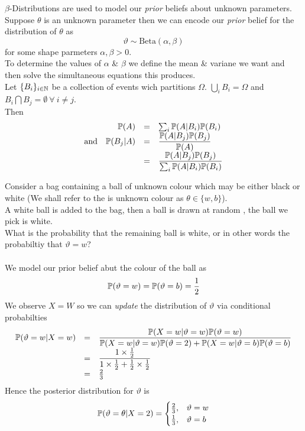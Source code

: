 \documentclass[11pt,a4paper]{article}
\begin{document}
$\beta$-Distributions are used to model our \textit{prior} beliefs about unknown parameters.\\
Suppose $\theta$ is an unknown parameter then we can encode our \textit{prior} belief for the distribution of $\theta$ as
$$\vartheta\sim\text{Beta}(\alpha,\beta)$$
for some shape parmeters $\alpha,\beta>0$.\\
\nb To determine the values of $\alpha$ \& $\beta$ we define the mean \& variane we want and then solve the simultaneous equations this produces.\\

Let $\{B_i\}_{i\in\mathbb{N}}$ be a collection of events wich partitions $\Omega$. \ie $\bigcup_iB_i=\Omega$ and $B_i\bigcap B_j=\emptyset\ \forall\ i\neq j$.\\
Then
\[\begin{array}{rrcl}
&\mathbb{P}(A)&=&\sum_i\mathbb{P}(A|B_i)\mathbb{P}(B_i)\\
\text{and}&\mathbb{P}(B_j|A)&=&\dfrac{\mathbb{P}(A|B_j)\mathbb{P}(B_j)}{\mathbb{P}(A)}\\
&&=&\dfrac{\mathbb{P}(A|B_j)\mathbb{P}(B_j)}{\sum_i\mathbb{P}(A|B_i)\mathbb{P}(B_i)}
\end{array}\]

Consider a bag containing a ball of unknown colour which may be either black or white (We shall refer to the is unknown colour as $\theta\in\{w,b\}$).\\
A white ball is added to the bag, then a ball is drawn at random , the ball we pick is white.\\
What is the probability that the remaining ball is white, or in other words the probabiltiy that $\vartheta=w$?\\
\\
We model our prior belief abut the colour of the ball as
$$\mathbb{P}(\vartheta=w)=\mathbb{P}(\vartheta=b)=\frac{1}{2}$$
We observe $X=W$ so we can \textit{update} the distribution of $\vartheta$ via conditional probabilties
\[\begin{array}{rcl}
\mathbb{P}(\vartheta=w|X=w)&=&\dfrac{\mathbb{P}(X=w|\vartheta=w)\mathbb{P}(\vartheta=w)}{\mathbb{P}(X=w|\vartheta=w)\mathbb{P}(\vartheta=2)+\mathbb{P}(X=w|\vartheta=b)\mathbb{P}(\vartheta=b)}\\
&=&\dfrac{1\times\frac{1}{2}}{1\times\frac{1}{2}+\frac{1}{2}\times\frac{1}{2}}\\
&=&\frac{2}{3}
\end{array}\]
Hence the posterior distribution for $\vartheta$ is
$$\mathbb{P}(\vartheta=\theta|X=2)=\begin{cases}\frac{2}{3},&\vartheta=w\\\frac{1}{3},&\vartheta=b\end{cases}$$
\end{document}
